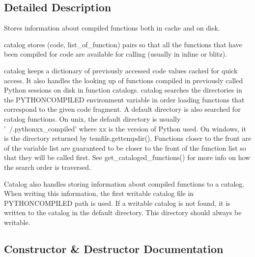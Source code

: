 \subsection{Detailed Description}
\begin{DoxyVerb}Stores information about compiled functions both in cache and on disk.

    catalog stores (code, list_of_function) pairs so that all the functions
    that have been compiled for code are available for calling (usually in
    inline or blitz).

    catalog keeps a dictionary of previously accessed code values cached
    for quick access.  It also handles the looking up of functions compiled
    in previously called Python sessions on disk in function catalogs.
    catalog searches the directories in the PYTHONCOMPILED environment
    variable in order loading functions that correspond to the given code
    fragment.  A default directory is also searched for catalog functions.
    On unix, the default directory is usually '~/.pythonxx_compiled' where
    xx is the version of Python used. On windows, it is the directory
    returned by temfile.gettempdir().  Functions closer to the front are of
    the variable list are guaranteed to be closer to the front of the
    function list so that they will be called first.  See
    get_cataloged_functions() for more info on how the search order is
    traversed.

    Catalog also handles storing information about compiled functions to
    a catalog.  When writing this information, the first writable catalog
    file in PYTHONCOMPILED path is used.  If a writable catalog is not
    found, it is written to the catalog in the default directory.  This
    directory should always be writable.
\end{DoxyVerb}
 

\subsection{Constructor \& Destructor Documentation}
\hypertarget{classscipy_1_1weave_1_1catalog_1_1catalog_a7e6eaac72a04fee02e0267c0b34e47f8}{}
